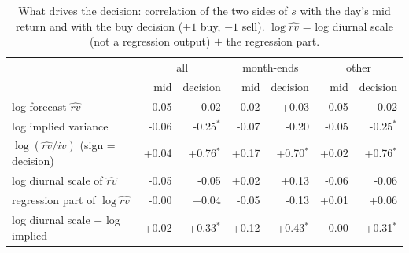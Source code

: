 \documentclass[10pt]{article}
\begin{document}
\begin{table}[h]\centering\small
\caption{What drives the decision: correlation of the two sides of $s$ with the day's mid return and with the buy decision ($+1$ buy, $-1$ sell). $\log\hat{rv}$ = log diurnal scale (not a regression output) $+$ the regression part.}
\begin{tabular}{lrrrrrr}\toprule
 & \multicolumn{2}{c}{all} & \multicolumn{2}{c}{month-ends} & \multicolumn{2}{c}{other}\\
 & mid & decision & mid & decision & mid & decision\\\midrule
log forecast $\hat{rv}$ & -0.05 & -0.02 & -0.02 & +0.03 & -0.05 & -0.02 \\
log implied variance & -0.06 & -0.25$^{*}$ & -0.07 & -0.20 & -0.05 & -0.25$^{*}$ \\
$\log(\hat{rv}/iv)$ (sign = decision) & +0.04 & +0.76$^{*}$ & +0.17 & +0.70$^{*}$ & +0.02 & +0.76$^{*}$ \\
log diurnal scale of $\hat{rv}$ & -0.05 & -0.05 & +0.02 & +0.13 & -0.06 & -0.06 \\
regression part of $\log\hat{rv}$ & -0.00 & +0.04 & -0.05 & -0.13 & +0.01 & +0.06 \\
log diurnal scale $-$ log implied & +0.02 & +0.33$^{*}$ & +0.12 & +0.43$^{*}$ & -0.00 & +0.31$^{*}$ \\
\bottomrule\end{tabular}\end{table}
\end{document}
